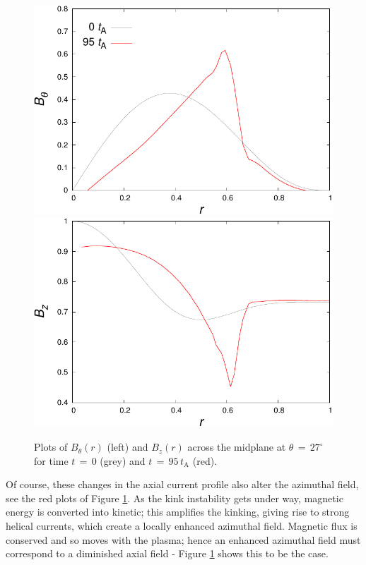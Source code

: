 \documentclass{./packages/rs/rsproca}
\begin{document}
\begin{figure}[h!]
  \center  
  \includegraphics[scale=0.52]{./gnuplot/256x256x512/btheta_r_19}
  \hspace{5pt}
  \includegraphics[scale=0.52]{./gnuplot/256x256x512/bz_r_19}
  \caption{\small{Plots of $B_{\theta}(r)$ (left) and $B_{z}(r)$ across the midplane at $\theta\,{=}\,27^{\circ}$ for time $t\,{=}\,0$ (grey) and $t\,{=}\,95\,t_{\mathrm{A}}$ (red).}}
  \label{b_rad}
  \vspace{-10pt}
\end{figure}
Of course, these changes in the axial current profile also alter the azimuthal field, see the red plots of Figure \ref{b_rad}. As the kink instability gets under way, magnetic energy is converted into kinetic; this amplifies the kinking, giving rise to strong helical currents, which create a locally enhanced azimuthal field. Magnetic flux is conserved and so moves with the plasma; hence an enhanced azimuthal field must correspond to a diminished axial field - Figure \ref{b_rad} shows this to be the case.
\end{document}
